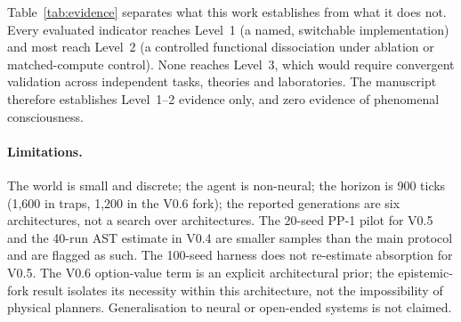 \documentclass{article}
\begin{document}
Table~\ref{tab:evidence} separates what this work establishes from what it does not. Every evaluated
indicator reaches Level~1 (a named, switchable implementation) and most reach Level~2 (a controlled
functional dissociation under ablation or matched-compute control). None reaches Level~3, which would
require convergent validation across independent tasks, theories and laboratories. The manuscript
therefore establishes Level~1--2 evidence only, and zero evidence of phenomenal consciousness.

\begin{table}[t]
\centering
\small
\caption{Three-level evidence classification for the evaluated indicators. Level~1 is implementation;
Level~2 is controlled functional validation in this sandbox; Level~3 is broad theoretical validation
across independent tasks, theories and laboratories. This work claims Level~1--2 only.}
\label{tab:evidence}
\end{table}

\paragraph{Limitations.}
The world is small and discrete; the agent is non-neural; the horizon is 900 ticks (1{,}600 in traps, 1{,}200 in the V0.6 fork); the reported generations are six architectures, not a search over architectures. The 20-seed PP-1 pilot for V0.5 and the 40-run AST estimate in V0.4 are smaller samples than the main protocol and are flagged as such. The 100-seed harness does not re-estimate absorption for V0.5. The V0.6 option-value term is an explicit architectural prior; the epistemic-fork result isolates its necessity within this architecture, not the impossibility of physical planners. Generalisation to neural or open-ended systems is not claimed.
\end{document}
